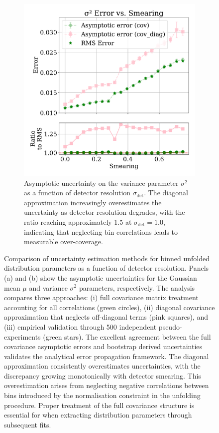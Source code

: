 \begin{figure}
\begin{subfigure}[t]{0.48\textwidth}
        \includegraphics[width=\textwidth]{figures/chapter-07/var_error_plot_with_errorbars_ratio.pdf}
        \caption{Asymptotic uncertainty on the variance parameter $\sigma^2$ as a function of detector resolution $\sigma_{\text{det}}$.
        The diagonal approximation increasingly overestimates the uncertainty as detector resolution degrades, with the ratio reaching approximately 1.5 at $\sigma_{\text{det}} = 1.0$, indicating that neglecting bin correlations leads to measurable over-coverage.}
        \label{fig:var_error_plot_with_errorbars}
    \end{subfigure}
    \caption[Comparison of uncertainty estimation methods for binned unfolded distribution parameters as a function of detector resolution.]{Comparison of uncertainty estimation methods for binned unfolded distribution parameters as a function of detector resolution. Panels (a) and (b) show the asymptotic uncertainties for the Gaussian mean $\mu$ and variance $\sigma^2$ parameters, respectively. The analysis compares three approaches: (i) full covariance matrix treatment accounting for all correlations (green circles), (ii) diagonal covariance approximation that neglects off-diagonal terms (pink squares), and (iii) empirical validation through 500 independent pseudo-experiments (green stars). The excellent agreement between the full covariance asymptotic errors and bootstrap derived uncertainties validates the analytical error propagation framework. The diagonal approximation consistently overestimates uncertainties, with the discrepancy growing monotonically with detector smearing. This overestimation arises from neglecting negative correlations between bins introduced by the normalisation constraint in the unfolding procedure. Proper treatment of the full covariance structure is essential for when extracting distribution parameters through subsequent fits.}
    \label{fig:uncertsfullybinned}
\end{figure}

